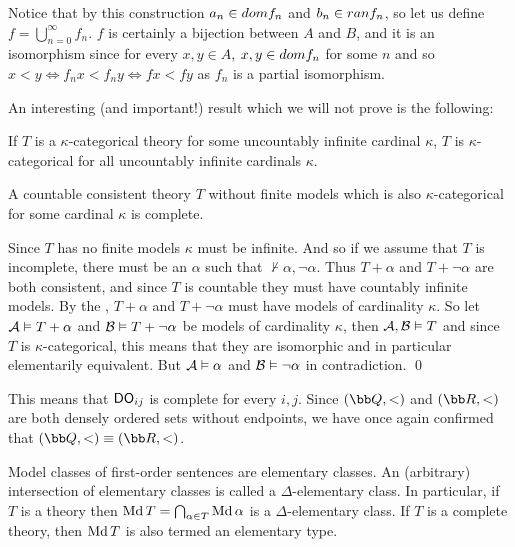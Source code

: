     Notice that by this construction $a_n\in{\sl dom}f_n$ and $b_n\in{\sl ran}f_n$, so let us define $f=\bigcup_{n=0}^\infty f_n$.
    $f$ is certainly a bijection between $A$ and $B$, and it is an isomorphism since for every $x,y\in A$, $x,y\in{\sl dom}f_n$ for some $n$ and so $x<y\iff f_nx<f_ny\iff fx<fy$ as $f_n$ is a partial
    isomorphism.

\eexam

An interesting (and important!) result which we will not prove is the following:

\bthrm[title=Morley's Theorem, name=morleystheorem]

    If $T$ is a $\kappa$-categorical theory for some uncountably infinite cardinal $\kappa$, $T$ is $\kappa$-categorical for all uncountably infinite cardinals $\kappa$.

\ethrm

\bthrm[title=Vaught's Test, name=vaughtstest]

    A countable consistent theory $T$ without finite models which is also $\kappa$-categorical for some cardinal $\kappa$ is complete.

\ethrm

Since $T$ has no finite models $\kappa$ must be infinite.
And so if we assume that $T$ is incomplete, there must be an $\alpha$ such that $\nvdash\alpha,\neg\alpha$.
Thus $T+\alpha$ and $T+\neg\alpha$ are both consistent, and since $T$ is countable they must have countably infinite models.
By the , $T+\alpha$ and $T+\neg\alpha$ must have models of cardinality $\kappa$.
So let ${\cal A}\vDash T+\alpha$ and ${\cal B}\vDash T+\neg\alpha$ be models of cardinality $\kappa$, then ${\cal A},{\cal B}\vDash T$ and since $T$ is $\kappa$-categorical, this means that they are
isomorphic and in particular elementarily equivalent.
But ${\cal A}\vDash\alpha$ and ${\cal B}\vDash\neg\alpha$ in contradiction.
\qed

This means that ${\sf DO}_{ij}$ is complete for every $i,j$.
Since $({\bb Q},<)$ and $({\bb R},<)$ are both densely ordered sets without endpoints, we have once again confirmed that $({\bb Q},<)\equiv({\bb R},<)$.

\bdefn

    Model classes of first-order sentences are {\emphcolor elementary classes}.
    An (arbitrary) intersection of elementary classes is called a {\emphcolor $\Delta$-elementary class}.
    In particular, if $T$ is a theory then $\mathop{\rm Md} T=\bigcap_{\alpha\in T}\mathop{\rm Md}\alpha$ is a $\Delta$-elementary class.
    If $T$ is a complete theory, then $\mathop{\rm Md} T$ is also termed an {\emphcolor elementary type}.

